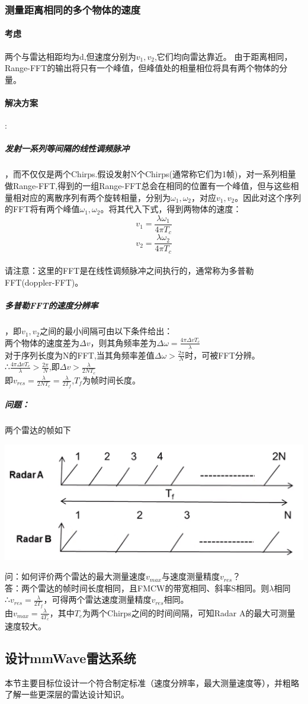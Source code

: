 \documentclass[UTF8]{ctexart}
\begin{document}
\subsubsection{测量距离相同的多个物体的速度}
\paragraph{考虑}两个与雷达相距均为d,但速度分别为$v_1,v_2$,它们均向雷达靠近。
由于距离相同，Range-FFT的输出将只有一个峰值，但峰值处的相量相位将具有两个物体的分量。
\paragraph{解决方案}:
\subparagraph{发射一系列等间隔的线性调频脉冲}，而不仅仅是两个Chirps.假设发射N个Chirps(通常称它们为1帧)，对一系列相量做Range-FFT,得到的一组Range-FFT总会在相同的位置有一个峰值，但与这些相量相对应的离散序列有两个旋转相量，分别为$\omega_1,\omega_2$，对应$v_1,v_2$。因此对这个序列的FFT将有两个峰值$\omega_1,\omega_2$。将其代入下式，得到两物体的速度：\\
\[v_1=\frac{\lambda \omega_1}{4 \pi T_c}\]
\[v_2=\frac{\lambda \omega_2}{4 \pi T_c}\]\\
请注意：这里的FFT是在线性调频脉冲之间执行的，通常称为多普勒FFT(doppler-FFT)。
\subparagraph{多普勒FFT的速度分辨率}，即$v_1,v_2$之间的最小间隔可由以下条件给出：\\
两个物体的速度差为$\Delta v$，则其角频率差为\(\Delta \omega=\frac{4\pi \Delta v T_c}{\lambda}\)\\
对于序列长度为N的FFT,当其角频率差值$\Delta \omega>\frac{2\pi}{N}$时，可被FFT分辨。\\
∴$\frac{4\pi \Delta v T_c}{\lambda}>\frac{2\pi}{N}$,即$\Delta v > \frac{\lambda}{2NT_c}$\\
即$v_{res}=\frac{\lambda}{2NT_c}=\frac{\lambda}{2T_f}$,$T_f$为帧时间长度。\\
\subparagraph{问题：}两个雷达的帧如下

{\centering \includegraphics[width = .4\textwidth]{pic/diffframe.png}

}
问：如何评价两个雷达的最大测量速度$v_{max}$与速度测量精度$v_{res}$？\\
答：两个雷达的帧时间长度相同，且FMCW的带宽相同、斜率S相同。则$\lambda$相同\\
∴$v_{res}=\frac{\lambda}{2T_f}$，可得两个雷达速度测量精度$v_{res}$相同。\\
由$v_{max}=\frac{\lambda}{4T_c}$，其中$T_c$为两个Chirps之间的时间间隔，可知Radar A的最大可测量速度较大。

\subsection{设计mmWave雷达系统}
本节主要目标位设计一个符合制定标准（速度分辨率，最大测量速度等），并粗略了解一些更深层的雷达设计知识。
\subsubsection{}
\end{document}
